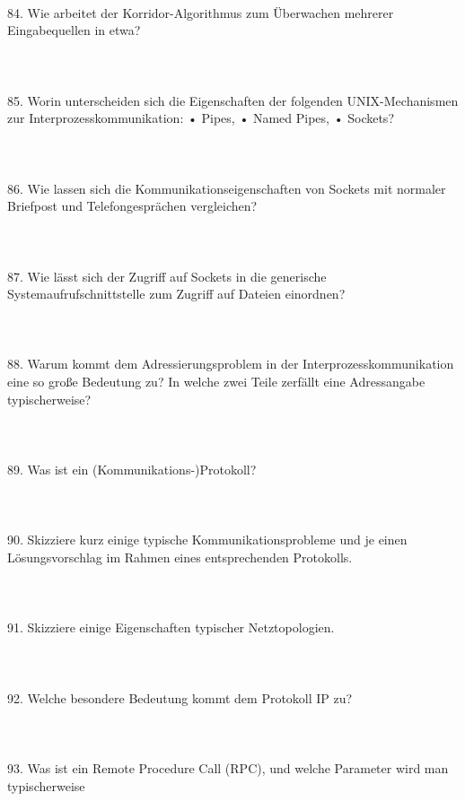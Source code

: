 \documentclass{article}
\begin{document}
\\
84. Wie arbeitet der Korridor-Algorithmus zum Überwachen mehrerer Eingabequellen in etwa?
\\
\\
\\
\\
85. Worin unterscheiden sich die Eigenschaften der folgenden UNIX-Mechanismen zur Interprozesskommunikation:
• Pipes,
• Named Pipes,
• Sockets?
\\
\\
\\
\\
86. Wie lassen sich die Kommunikationseigenschaften von Sockets mit normaler Briefpost und
Telefongesprächen vergleichen?
\\
\\
\\
\\
87. Wie lässt sich der Zugriff auf Sockets in die generische Systemaufrufschnittstelle zum Zugriff
auf Dateien einordnen?
\\
\\
\\
\\
88. Warum kommt dem Adressierungsproblem in der Interprozesskommunikation eine so große
Bedeutung zu? In welche zwei Teile zerfällt eine Adressangabe typischerweise?
\\
\\
\\
\\
89. Was ist ein (Kommunikations-)Protokoll?
\\
\\
\\
\\
90. Skizziere kurz einige typische Kommunikationsprobleme und je einen Lösungsvorschlag im
Rahmen eines entsprechenden Protokolls.
\\
\\
\\
\\
91. Skizziere einige Eigenschaften typischer Netztopologien.
\\
\\
\\
\\
92. Welche besondere Bedeutung kommt dem Protokoll IP zu?
\\
\\
\\
\\
93. Was ist ein Remote Procedure Call (RPC), und welche Parameter wird man typischerweise
\end{document}
